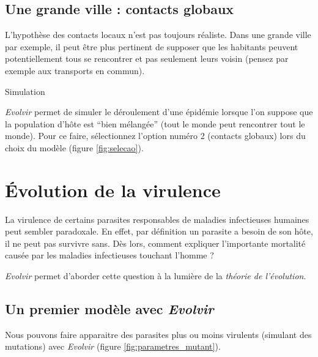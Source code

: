 \documentclass[12pt]{article}
\begin{document}
\subsection{Une grande ville : contacts globaux}

L'hypothèse des contacts locaux n'est pas toujours réaliste. Dans une
grande ville par exemple, il peut être plus pertinent de supposer que
les habitants peuvent potentiellement tous se rencontrer et pas
seulement leurs voisin (pensez par exemple aux transports en commun).

                                                                                                                
\begin{bclogo}[couleur = gray!30, logo = \bclampe , barre =                                                      
none, noborder=true ]{Simulation}                                                                                  

\textit{Evolvir} permet de simuler le déroulement d'une épidémie
lorsque l'on suppose que la population d'hôte est ``bien mélangée''
(tout le monde peut rencontrer tout le monde). Pour ce faire,
sélectionnez l'option numéro 2 (contacts globaux) lors du choix du
modèle (figure \ref{fig:selecao}).

\end{bclogo}                                                                                                        

\section{Évolution de la virulence}

La virulence de certains parasites responsables de maladies
infectieuses humaines peut sembler paradoxale. En effet, par
définition un parasite a besoin de son hôte, il ne peut pas survivre
sans. Dès lors, comment expliquer l'importante mortalité causée par
les maladies infectieuses touchant l'homme ?

\textit{Evolvir} permet d'aborder cette question à la lumière de la
\emph{théorie de l'évolution}.

\subsection{Un premier modèle avec \textit{Evolvir}}


Nous pouvons faire apparaitre des parasites plus ou moins virulents
(simulant des mutations) avec \textit{Evolvir} (figure
\ref{fig:parametres_mutant}).
\end{document}
